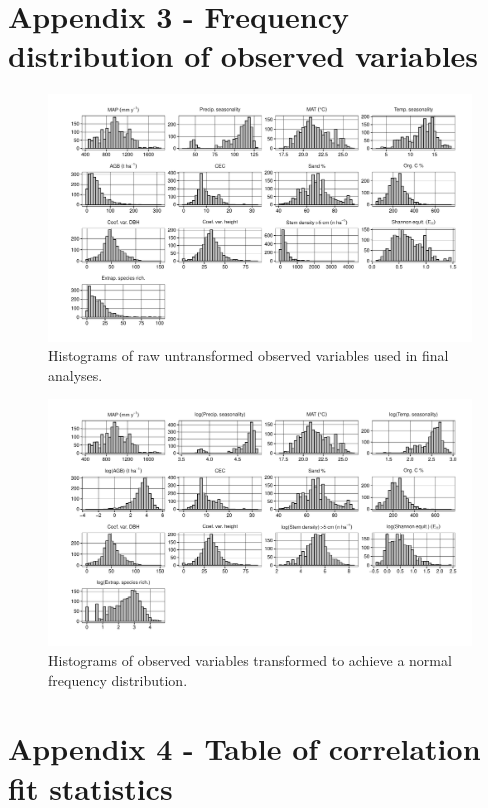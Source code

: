 \documentclass[11pt,a4paper]{article}
\begin{document}
\section{Appendix 3 - Frequency distribution of observed variables} \label{appendixc}

\begin{figure}[H]
\centering
	\includegraphics[width=\textwidth]{histogram_raw_obs}
	\caption{Histograms of raw untransformed observed variables used in final analyses.}
	\label{histogram_raw_obs}
\end{figure}

\begin{figure}[H]
\centering
	\includegraphics[width=\textwidth]{histogram_trans_obs}
	\caption{Histograms of observed variables transformed to achieve a normal frequency distribution.}
	\label{histogram_trans_obs}
\end{figure}

\section{Appendix 4 - Table of correlation fit statistics} \label{appendixd}


\end{document}

